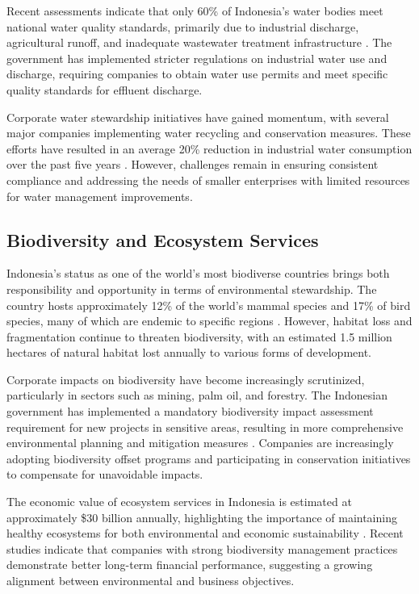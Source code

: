 Recent assessments indicate that only 60\% of Indonesia's water bodies meet national water quality standards, primarily due to industrial discharge, agricultural runoff, and inadequate wastewater treatment infrastructure \cite{ref_id5}. The government has implemented stricter regulations on industrial water use and discharge, requiring companies to obtain water use permits and meet specific quality standards for effluent discharge.

Corporate water stewardship initiatives have gained momentum, with several major companies implementing water recycling and conservation measures. These efforts have resulted in an average 20\% reduction in industrial water consumption over the past five years \cite{ref_id6}. However, challenges remain in ensuring consistent compliance and addressing the needs of smaller enterprises with limited resources for water management improvements.

\subsection{Biodiversity and Ecosystem Services}

Indonesia's status as one of the world's most biodiverse countries brings both responsibility and opportunity in terms of environmental stewardship. The country hosts approximately 12\% of the world's mammal species and 17\% of bird species, many of which are endemic to specific regions \cite{ref_id7}. However, habitat loss and fragmentation continue to threaten biodiversity, with an estimated 1.5 million hectares of natural habitat lost annually to various forms of development.

Corporate impacts on biodiversity have become increasingly scrutinized, particularly in sectors such as mining, palm oil, and forestry. The Indonesian government has implemented a mandatory biodiversity impact assessment requirement for new projects in sensitive areas, resulting in more comprehensive environmental planning and mitigation measures \cite{ref_id8}. Companies are increasingly adopting biodiversity offset programs and participating in conservation initiatives to compensate for unavoidable impacts.

The economic value of ecosystem services in Indonesia is estimated at approximately \$30 billion annually, highlighting the importance of maintaining healthy ecosystems for both environmental and economic sustainability \cite{ref_id9}. Recent studies indicate that companies with strong biodiversity management practices demonstrate better long-term financial performance, suggesting a growing alignment between environmental and business objectives.

